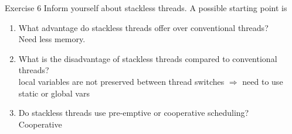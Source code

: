\documentclass[10pt]{beamer}
\begin{document}
\begin{frame}[allowframebreaks]{Exercise 6}
    Inform yourself about stackless threads.
	A possible starting point is	
	\begin{enumerate}
		\item What advantage do stackless threads offer over conventional threads?\\
		\alert{Need less memory.}
		\item What is the disadvantage of stackless threads compared to conventional threads? \\
		\alert{local variables are not preserved between thread switches $\Rightarrow$ need to use static or global vars}
		\item Do stackless threads use pre-emptive or cooperative scheduling? \\
		\alert{Cooperative}
	\end{enumerate}
\end{frame}
    
\end{document}
